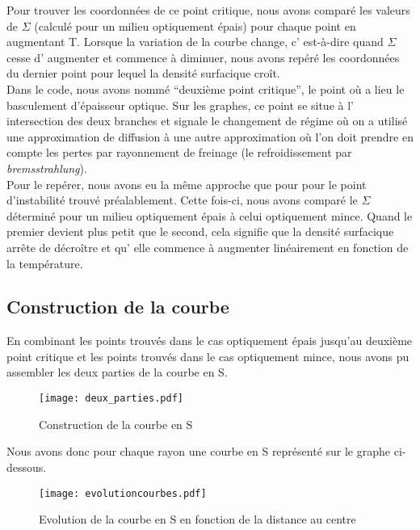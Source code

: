 Pour trouver les coordonnées de ce point critique, nous avons comparé les valeurs de $\Sigma$ (calculé pour un milieu optiquement épais) pour chaque point en augmentant T. Lorsque la variation de la courbe change, c' est-à-dire quand $\Sigma$ cesse d' augmenter et commence à diminuer, nous avons repéré les coordonnées du dernier point pour lequel la densité surfacique croît.  
\\
Dans le code, nous avons nommé ``deuxième point critique'', le point où a lieu le basculement d'épaisseur optique. Sur les graphes, ce point se situe à l' intersection des deux branches et signale le changement de régime où on a utilisé une approximation de diffusion à une autre approximation où l'on doit prendre en compte les pertes par rayonnement de freinage (le refroidissement par \emph{bremsstrahlung}).
\\
Pour le repérer, nous avons eu la même approche que pour pour le point d'instabilité trouvé préalablement. Cette fois-ci, nous avons comparé le $\Sigma$ déterminé pour un milieu optiquement épais à celui optiquement mince. Quand le premier devient plus petit que le second, cela signifie que la densité surfacique arrête de décroître et qu' elle commence à augmenter linéairement en fonction de la température. 
\\

\subsection{Construction de la courbe}

En combinant les points trouvés dans le cas optiquement épais jusqu'au deuxième point critique et les points trouvés dans le cas optiquement mince, nous avons pu assembler les deux parties de la courbe en S. 

\begin{figure}[htb!]
	\centering
	\texttt{[image: deux\_parties.pdf]}
	\caption{Construction de la courbe en S}
	\label{Fig::bench}
\end{figure}


Nous avons donc pour chaque rayon une courbe en S représenté sur le graphe ci-dessous.
\begin{figure}[htb!]
	\centering
	\texttt{[image: evolutioncourbes.pdf]}
	\caption{Evolution de la courbe en S en fonction de la distance au centre}
	\label{Fig::bench}
\end{figure}



